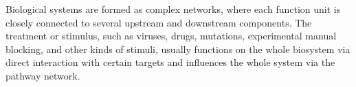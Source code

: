 Biological systems are formed as complex networks, where each function unit is closely connected to several upstream and downstream components. The treatment or stimulus, such as viruses, drugs, mutations, experimental manual blocking, and other kinds of stimuli, usually functions on the whole biosystem via direct interaction with certain targets and influences the whole system via the pathway network. 
